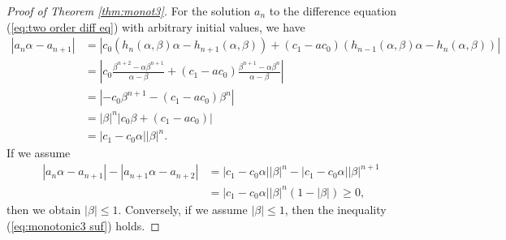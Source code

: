 \documentclass[10pt,a4paper]{amsart}
\begin{document}
\begin{proof}[Proof of Theorem \ref{thm:monot3}]
For the solution $a_n$ to the difference equation (\ref{eq:two order diff eq}) with 
arbitrary initial values, we have 
\begin{align*}
\left|a_{n}\alpha -a_{n+1}\right|
   &=
   \left|c_{0}(h_{n}(\alpha ,\beta )\alpha -h_{n+1}(\alpha ,\beta ))+(c_{1}-ac_{0})(h_{n-1}(\alpha ,\beta )\alpha -h_{n}(\alpha ,\beta ))\right| \\
   &=
   \left|c_{0}\frac{\beta ^{n+2}-\alpha \beta ^{n+1}}{\alpha -\beta }
   +(c_{1}-ac_{0})\frac{\beta ^{n+1}-\alpha \beta ^{n}}{\alpha -\beta }\right| \\
   &=
   \left|-c_{0}\beta ^{n+1}
   -(c_{1}-ac_{0})\beta ^{n}\right| \\
   &=
   |\beta |^{n}
   \left|c_{0}\beta 
   +(c_{1}-ac_{0})\right| \\
   &=
   |c_{1}-c_{0}\alpha |
   |\beta |^{n}.
\end{align*}
If we assume 
\begin{align}
\left|a_{n}\alpha -a_{n+1}\right|-\left|a_{n+1}\alpha -a_{n+2}\right|
   &=
   |c_{1}-c_{0}\alpha |
   |\beta |^{n}
   -|c_{1}-c_{0}\alpha |
   |\beta |^{n+1} \nonumber \\
\label{eq:monotonic3 suf}
   &=
   |c_{1}-c_{0}\alpha |
   |\beta |^{n}   
   (1-|\beta |)\geq 0 ,
\end{align}
then we obtain $|\beta |\leq 1$. 
Conversely, if we assume $|\beta |\leq 1$, then 
the inequality (\ref{eq:monotonic3 suf}) holds. 
\end{proof}
\end{document}
